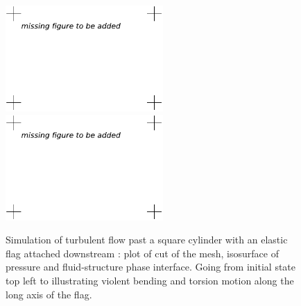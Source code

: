 \begin{figure}[!h]
{\includegraphics[width=6cm]{chapters/hoffman-1/pdf/cube550.pdf}
\includegraphics[width=6cm]{chapters/hoffman-1/pdf/cube649.pdf}
}
\caption{
Simulation of turbulent flow past a square cylinder with an elastic
flag attached downstream \cite{HoffmanJanssonLoggEtAl2009}: plot of cut of
the mesh, isosurface of pressure and fluid-structure phase
interface. Going from initial state top left to illustrating violent
bending and torsion motion along the long axis of the flag.  }
\label{fig:flag}
\end{figure}
